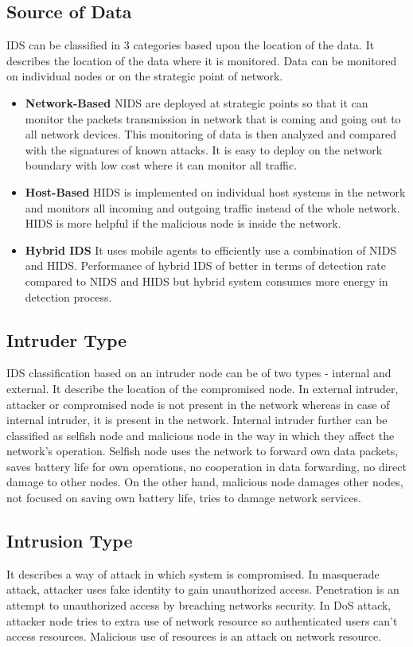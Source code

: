\subsection{Source of Data}
IDS can be classified in 3 categories based upon the location of the data. It describes the location of the data where it is monitored. Data can be monitored on individual nodes or on the strategic point of network.
\begin{itemize}
    \item{\textbf{Network-Based} NIDS are deployed at strategic points so that it can monitor the packets transmission in network that is coming and going out to all network devices. This monitoring of data is then analyzed and compared with the signatures of known attacks. It is easy to deploy on the network boundary  with low cost where it can monitor all traffic.}
    \item{\textbf{Host-Based} HIDS is implemented on individual host systems in the network and monitors all incoming and outgoing traffic instead of the whole network. HIDS is more helpful if the malicious node is inside the network.}
    \item{\textbf{Hybrid IDS} It uses mobile agents to efficiently use a combination of NIDS and HIDS. Performance of hybrid IDS of better in terms of detection rate compared to NIDS and HIDS but hybrid system consumes more energy in detection process.}
\end{itemize}
\subsection{Intruder Type}
IDS classification based on  an intruder node can be of two types - internal and external. It describe the location of the compromised node. In external intruder, attacker or compromised node is not present in the network whereas in case of internal intruder, it is present in the network. Internal intruder further can be classified as selfish node and malicious node in the way in which they affect the network's operation. Selfish node uses the network to forward own data packets, saves battery life for own operations, no cooperation in data forwarding, no direct damage to other nodes. On the other hand, malicious node damages other nodes, not focused on saving own battery life, tries to damage network services.
\subsection{Intrusion Type}
It describes a way of attack in which system is compromised. In masquerade attack, attacker uses fake identity to gain unauthorized access. Penetration is an attempt to unauthorized access by breaching networks security. In DoS attack, attacker node tries to extra use of network resource so authenticated users can’t access resources. Malicious use of resources is an attack on network resource.


